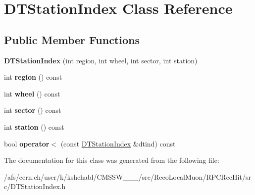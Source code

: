 \hypertarget{classDTStationIndex}{\section{D\-T\-Station\-Index Class Reference}
\label{classDTStationIndex}
}
\subsection*{Public Member Functions}
\begin{DoxyCompactItemize}
\item 
\hypertarget{classDTStationIndex_a8275652576634a7fcc6780faa5402c81}{{\bfseries D\-T\-Station\-Index} (int region, int wheel, int sector, int station)}\label{classDTStationIndex_a8275652576634a7fcc6780faa5402c81}

\item 
\hypertarget{classDTStationIndex_a80288ecc3a6344fc3e4ab27bddd9b22c}{int {\bfseries region} () const }\label{classDTStationIndex_a80288ecc3a6344fc3e4ab27bddd9b22c}

\item 
\hypertarget{classDTStationIndex_aa2c98ab9f75a0f62863d5236a737a7fa}{int {\bfseries wheel} () const }\label{classDTStationIndex_aa2c98ab9f75a0f62863d5236a737a7fa}

\item 
\hypertarget{classDTStationIndex_a4fcee2ba3d708e68e42c1bf69b506a83}{int {\bfseries sector} () const }\label{classDTStationIndex_a4fcee2ba3d708e68e42c1bf69b506a83}

\item 
\hypertarget{classDTStationIndex_a97d80806cf202ea9a7327c29a0a140ef}{int {\bfseries station} () const }\label{classDTStationIndex_a97d80806cf202ea9a7327c29a0a140ef}

\item 
\hypertarget{classDTStationIndex_a900e89c9ffc9f125ac98f2500514d9ab}{bool {\bfseries operator$<$} (const \hyperlink{classDTStationIndex}{D\-T\-Station\-Index} \&dtind) const }\label{classDTStationIndex_a900e89c9ffc9f125ac98f2500514d9ab}

\end{DoxyCompactItemize}


The documentation for this class was generated from the following file\-:\begin{DoxyCompactItemize}
\item 
/afs/cern.\-ch/user/k/kshchabl/\-C\-M\-S\-S\-W\-\_\-\_\-\_/src/\-Reco\-Local\-Muon/\-R\-P\-C\-Rec\-Hit/src/D\-T\-Station\-Index.\-h\end{DoxyCompactItemize}
